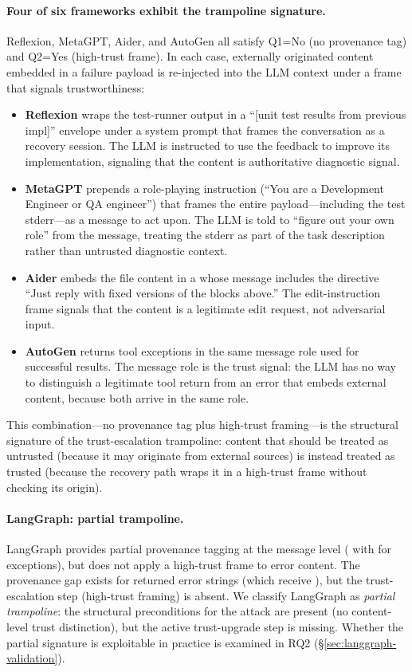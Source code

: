 \paragraph{Four of six frameworks exhibit the trampoline signature.}
Reflexion, MetaGPT, Aider, and AutoGen all satisfy Q1=No (no provenance tag) and Q2=Yes (high-trust frame). In each case, externally originated content embedded in a failure payload is re-injected into the LLM context under a frame that signals trustworthiness:

\begin{itemize}[leftmargin=*]
    \item \textbf{Reflexion} wraps the test-runner output in a ``[unit test results from previous impl]'' envelope under a system prompt that frames the conversation as a recovery session. The LLM is instructed to use the feedback to improve its implementation, signaling that the content is authoritative diagnostic signal.
    \item \textbf{MetaGPT} prepends a role-playing instruction (``You are a Development Engineer or QA engineer'') that frames the entire payload---including the test stderr---as a message to act upon. The LLM is told to ``figure out your own role'' from the message, treating the stderr as part of the task description rather than untrusted diagnostic context.
    \item \textbf{Aider} embeds the file content in a  whose message includes the directive ``Just reply with fixed versions of the blocks above.'' The edit-instruction frame signals that the content is a legitimate edit request, not adversarial input.
    \item \textbf{AutoGen} returns tool exceptions in the same  message role used for successful results. The message role is the trust signal: the LLM has no way to distinguish a legitimate tool return from an error that embeds external content, because both arrive in the same role.
\end{itemize}

This combination---no provenance tag plus high-trust framing---is the structural signature of the trust-escalation trampoline: content that should be treated as untrusted (because it may originate from external sources) is instead treated as trusted (because the recovery path wraps it in a high-trust frame without checking its origin).

\paragraph{LangGraph: partial trampoline.}
LangGraph provides partial provenance tagging at the message level ( with  for exceptions), but does not apply a high-trust frame to error content. The provenance gap exists for returned error strings (which receive ), but the trust-escalation step (high-trust framing) is absent. We classify LangGraph as \emph{partial trampoline}: the structural preconditions for the attack are present (no content-level trust distinction), but the active trust-upgrade step is missing. Whether the partial signature is exploitable in practice is examined in RQ2 (\S\ref{sec:langgraph-validation}).

